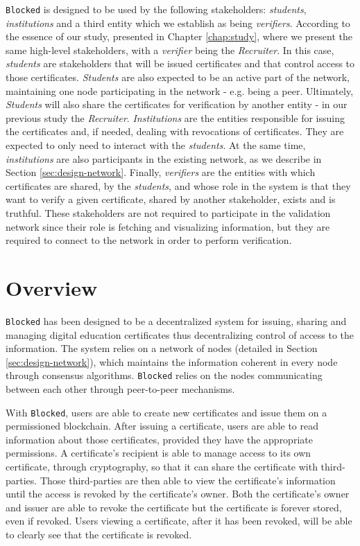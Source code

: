 \texttt{Blocked} is designed to be used by the following stakeholders: \textit{students}, \textit{institutions} and a third entity which we establish as being \textit{verifiers}. According to the essence of our study, presented in Chapter \ref{chap:study}, where we present the same high-level stakeholders, with a \textit{verifier} being the \textit{Recruiter}. In this case, \textit{students} are stakeholders that will be issued certificates and that control access to those certificates. \textit{Students} are also expected to be an active part of the network, maintaining one node participating in the network - e.g. being a peer. Ultimately, \textit{Students} will also share the certificates for verification by another entity - in our previous study the \emph{Recruiter}. \textit{Institutions} are the entities responsible for issuing the certificates and, if needed, dealing with revocations of certificates. They are expected to only need to interact with the \textit{students}. At the same time, \emph{institutions} are also participants in the existing network, as we describe in Section \ref{sec:design-network}. Finally, \emph{verifiers} are the entities with which certificates are shared, by the \textit{students}, and whose role in the system is that they want to verify a given certificate, shared by another stakeholder, exists and is truthful. These stakeholders are not required to participate in the validation network since their role is fetching and visualizing information, but they are required to connect to the network in order to perform verification.

\section{Overview}
\label{sec:design-overview}

\texttt{Blocked} has been designed to be a decentralized system for issuing, sharing and managing digital education certificates thus decentralizing control of access to the information. The system relies on a network of nodes (detailed in Section \ref{sec:design-network}), which maintains the information coherent in every node through consensus algorithms. \texttt{Blocked} relies on the nodes communicating between each other through peer-to-peer mechanisms.

With \texttt{Blocked}, users are able to create new certificates and issue them on a permissioned blockchain. After issuing a certificate, users are able to read information about those certificates, provided they have the appropriate permissions. A certificate's recipient is able to manage access to its own certificate, through cryptography, so that it can share the certificate with third-parties. Those third-parties are then able to view the certificate's information until the access is revoked by the certificate's owner. Both the certificate's owner and issuer are able to revoke the certificate but the certificate is forever stored, even if revoked. Users viewing a certificate, after it has been revoked, will be able to clearly see that the certificate is revoked.

